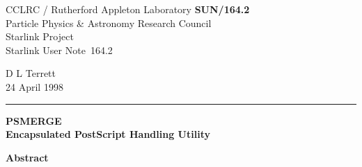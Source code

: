 \documentclass[twoside,11pt]{article}
\newcommand{\stardoccategory}  {Starlink User Note}
\newcommand{\stardocinitials}  {SUN}
\newcommand{\stardocnumber}    {164.2}
\newcommand{\stardocauthors}   {D L Terrett}
\newcommand{\stardocdate}      {24 April 1998}
\newcommand{\stardoctitle}     {PSMERGE \\
                                Encapsulated PostScript Handling Utility}
\newcommand{\stardocversion}   {[software-version]}
\newcommand{\stardocmanual}    {[manual-type]}
\newcommand{\stardocname}{\stardocinitials /\stardocnumber}
\newenvironment{latexonly}{}{}
\begin{document}
\thispagestyle{empty}

\begin{latexonly}
   CCLRC / {\sc Rutherford Appleton Laboratory} \hfill {\bf \stardocname}\\
   {\large Particle Physics \& Astronomy Research Council}\\
   {\large Starlink Project\\}
   {\large \stardoccategory\ \stardocnumber}
   \begin{flushright}
   \stardocauthors\\
   \stardocdate
   \end{flushright}
   \vspace{-4mm}
   \rule{\textwidth}{0.5mm}
   \vspace{5mm}
   \begin{center}
   {\Huge\bf  \stardoctitle \\ [2.5ex]}
   \end{center}
   \vspace{5mm}


   \vspace{10mm}
   \begin{center}
      {\Large\bf Abstract}
   \end{center}
\end{latexonly}
\end{document}
